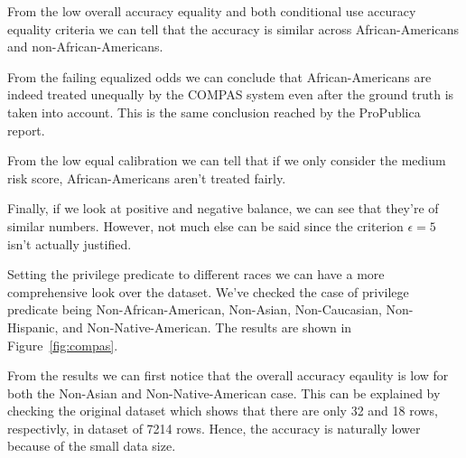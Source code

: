 \documentclass[conference]{IEEEtran}
\begin{document}
From the low overall accuracy equality and both conditional use accuracy equality criteria we can tell that the accuracy is similar across African-Americans and non-African-Americans.

From the failing equalized odds we can conclude that African-Americans are indeed treated unequally by the COMPAS system even after the ground truth is taken into account. This is the same conclusion reached by the ProPublica report.

From the low equal calibration we can tell that if we only consider the medium risk score, African-Americans aren't treated fairly.

Finally, if we look at positive and negative balance, we can see that they're of similar numbers. However, not much else can be said since the criterion $\epsilon = 5$ isn't actually justified.

Setting the privilege predicate to different races we can have a more comprehensive look over the dataset. We've checked the case of privilege predicate being Non-African-American, Non-Asian, Non-Caucasian, Non-Hispanic, and Non-Native-American. The results are shown in Figure~\ref{fig:compas}.

From the results we can first notice that the overall accuracy eqaulity is low for both the Non-Asian and Non-Native-American case. This can be explained by checking the original dataset which shows that there are only 32 and 18 rows, respectivly, in dataset of 7214 rows. Hence, the accuracy is naturally lower because of the small data size.
\end{document}
